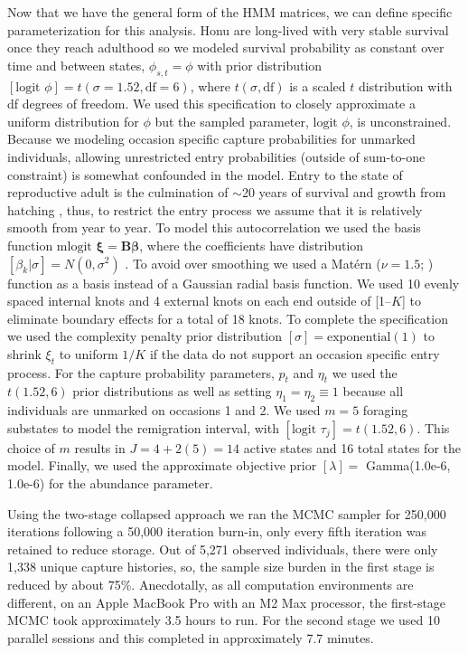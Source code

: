 \documentclass[11pt]{article}
\newcommand{\bb}{\ensuremath{\boldsymbol{\beta}}}
\begin{document}
Now that we have the general form of the HMM matrices, we can define specific parameterization for this analysis. Honu are long-lived with very stable survival once they reach adulthood \citep{PiacenzaEtAl2016a} so we modeled survival probability as constant over time and between states, $\phi_{s,t} = \phi$ with prior distribution $[\text{logit }\phi] = t(\sigma=1.52,\text{df}=6)$, where $t(\sigma,\text{df})$ is a scaled $t$ distribution with df degrees of freedom. We used this specification to closely approximate a uniform distribution for $\phi$ but the sampled parameter, $\text{logit }\phi$, is unconstrained. Because we modeling occasion specific capture probabilities for unmarked individuals, allowing unrestricted entry probabilities (outside of sum-to-one constraint) is somewhat confounded in the model. Entry to the state of reproductive adult is the culmination of $\sim$20 years of survival and growth from hatching \citep{HoutanEtAl2014a}, thus, to restrict the entry process we assume that it is relatively smooth from year to year. To model this autocorrelation we used the basis function $\text{mlogit }\boldsymbol{\xi}= \mathbf{B}\bb$, where the coefficients have distribution $[\beta_k|\sigma] = N(0,\sigma^2)$ \citep{hefley2016basis}. To avoid over smoothing we used a Mat\'{e}rn ($\nu=1.5$; \citealt{kammann2003geoadditive}) function as a basis instead of a Gaussian radial basis function. We used 10 evenly spaced internal knots and 4 external knots on each end outside of [1--$K$] to eliminate boundary effects for a total of 18 knots. To complete the specification we used the complexity penalty prior distribution $[\sigma] = \text{exponential}(1)$ \citep{martins2017penalising} to shrink $\xi_t$ to uniform $1/K$ if the data do not support an occasion specific entry process. For the capture probability parameters, $p_t$ and $\eta_t$ we used the $t(1.52,6)$ prior distributions as well as setting $\eta_1=\eta_2 \equiv 1$ because all individuals are unmarked on occasions 1 and 2. We used $m=5$ foraging substates to model the remigration interval, with $[\text{logit }\tau_j] = t(1.52,6)$. This choice of $m$ results in $J=4+2(5)=14$ active states and 16 total states for the model. Finally, we used the approximate objective prior $[\lambda]=$ Gamma(1.0e-6, 1.0e-6) for the abundance parameter.

Using the two-stage collapsed approach we ran the MCMC sampler for 250,000 iterations following a 50,000 iteration burn-in, only every fifth iteration was retained to reduce storage. Out of 5,271 observed individuals, there were only 1,338 unique capture histories, so, the sample size burden in the first stage is reduced by about 75\%. Anecdotally, as all computation environments are different, on an Apple MacBook Pro with an M2 Max processor, the first-stage MCMC took approximately 3.5 hours to run. For the second stage we used 10 parallel sessions and this completed in approximately 7.7 minutes. 
\end{document}
